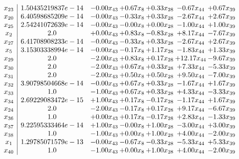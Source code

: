 \documentclass[8pt]{article}
\begin{document}
\[\begin{array}{c| c c@{\hskip 2pt} c@{\hskip 2pt} c@{\hskip 2pt} c@{\hskip 2pt} c@{\hskip 2pt} }
 x_{23}   &  1.50435219837e-14 & -0.00 x_{43} & +  0.67 x_{8} & +  0.33 x_{28} & -0.67 x_{44} & +  0.67 x_{39}\\
 x_{20}   &  6.40598685209e-14 & -0.00 x_{43} & -0.33 x_{8} & +  0.33 x_{28} & -2.67 x_{44} & +  2.67 x_{39}\\
 x_{25}   &  2.54241072639e-14 & -0.00 x_{43} & -0.00 x_{8} & +  0.00 x_{28} & -1.00 x_{44} & +  1.00 x_{39}\\
 x_{2}   &  2.0 & +  0.00 x_{43} & +  0.83 x_{8} & -0.83 x_{28} & +  8.17 x_{44} & -7.67 x_{39}\\
 x_{27}   &  6.41708908233e-14 & -0.00 x_{43} & -0.33 x_{8} & +  0.33 x_{28} & -2.67 x_{44} & +  2.67 x_{39}\\
 x_{5}   &  3.15303338994e-14 & -0.00 x_{43} & -0.17 x_{8} & +  1.17 x_{28} & -1.83 x_{44} & +  1.33 x_{39}\\
 x_{29}   &  2.0 & -2.00 x_{43} & +  0.83 x_{8} & +  0.17 x_{28} & + 12.17 x_{44} & -9.67 x_{39}\\
 x_{30}   &  2.0 & -2.00 x_{43} & +  0.67 x_{8} & +  0.33 x_{28} & +  7.33 x_{44} & -5.33 x_{39}\\
 x_{31}   &  2.0 & -2.00 x_{43} & +  0.50 x_{8} & +  0.50 x_{28} & +  9.50 x_{44} & -7.00 x_{39}\\
 x_{32}   &  3.90798504668e-14 & -0.00 x_{43} & +  0.67 x_{8} & +  0.33 x_{28} & -1.67 x_{44} & +  1.67 x_{39}\\
 x_{33}   &  1.0 & -1.00 x_{43} & +  0.67 x_{8} & +  0.33 x_{28} & +  4.33 x_{44} & -3.33 x_{39}\\
 x_{34}   &  2.69229083472e-15 & +  1.00 x_{43} & +  0.17 x_{8} & -0.17 x_{28} & -1.17 x_{44} & +  1.67 x_{39}\\
 x_{24}   &  2.0 & -2.00 x_{43} & -0.17 x_{8} & +  0.17 x_{28} & +  9.17 x_{44} & -6.67 x_{39}\\
 x_{36}   &  1.0 & +  0.00 x_{43} & +  0.17 x_{8} & -0.17 x_{28} & +  2.83 x_{44} & -1.33 x_{39}\\
 x_{37}   &  9.22595333464e-14 & +  1.00 x_{43} & -0.00 x_{8} & +  1.00 x_{28} & -3.00 x_{44} & +  3.00 x_{39}\\
 x_{38}   &  1.0 & -1.00 x_{43} & +  0.00 x_{8} & +  1.00 x_{28} & +  4.00 x_{44} & -2.00 x_{39}\\
 x_{1}   &  1.29785071579e-13 & -0.00 x_{43} & -0.67 x_{8} & -0.33 x_{28} & -5.33 x_{44} & +  5.33 x_{39}\\
 x_{40}   &  1.0 & -1.00 x_{43} & +  0.00 x_{8} & +  1.00 x_{28} & +  4.00 x_{44} & -2.00 x_{39}\\

\end{array}\]
\end{document}
